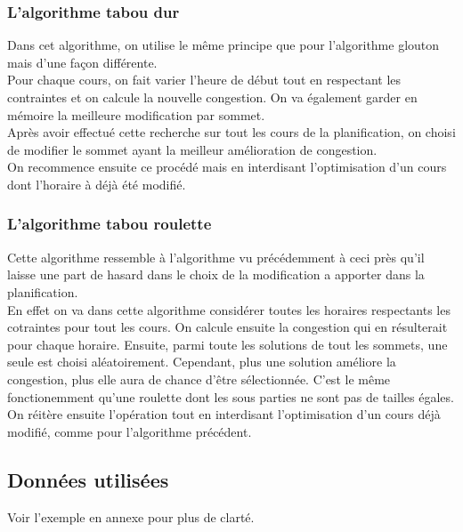 \documentclass[a4paper,11pt]{article}
\begin{document}
		\subsubsection{L'algorithme tabou dur}
		Dans cet algorithme, on utilise le même principe que pour l'algorithme glouton mais d'une façon différente.\\
		Pour chaque cours, on fait varier l'heure de début tout en respectant les contraintes et on calcule la nouvelle congestion. On va également garder en mémoire la meilleure modification par sommet.\\
		Après avoir effectué cette recherche sur tout les cours de la planification, on choisi de modifier le sommet ayant la meilleur amélioration de congestion.\\
		On recommence ensuite ce procédé mais en interdisant l'optimisation d'un cours dont l'horaire à déjà été modifié.
		\subsubsection{L'algorithme tabou roulette}
		Cette algorithme ressemble à l'algorithme vu précédemment à ceci près qu'il laisse une part de hasard dans le choix de la modification a apporter dans la planification.\\
		En effet on va dans cette algorithme considérer toutes les horaires respectants les cotraintes pour tout les cours. On calcule ensuite la congestion qui en résulterait pour chaque horaire.
		Ensuite, parmi toute les solutions de tout les sommets, une seule est choisi aléatoirement. Cependant, plus une solution améliore la congestion, plus elle aura de chance d'être sélectionnée. C'est le même fonctionemment qu'une roulette dont les sous parties ne sont pas de tailles égales.\\
		On réitère ensuite l'opération tout en interdisant l'optimisation d'un cours déjà modifié, comme pour l'algorithme précédent. 
	
	\subsection{Données utilisées}
		Voir l'exemple en annexe pour plus de clarté.
\end{document}
